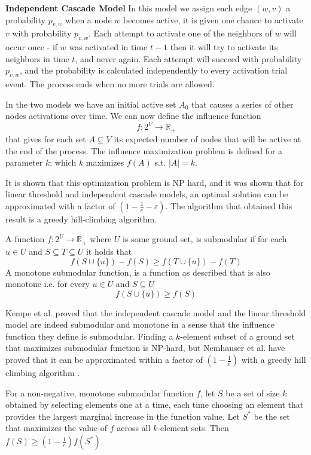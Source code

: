 \textbf{Independent Cascade Model}
In this model we assign each edge $(w,v)$ a probability $p_{v,w}$ when a node $w$ becomes active, it is given one chance to activate $v$ with probability $p_{v,w}$. Each attempt to activate one of the neighbors of $w$ will occur once - if $w$ was activated in time $t-1$ then it will try to activate its neighbors in time $t$, and never again. Each attempt will succeed with probability $p_{v,w}$, and the probability is calculated independently to every activation trial event. The process ends when no more trials are allowed.


In the two models we have an initial active set $A_0$ that causes a series of other nodes activations over time. We can now define the influence function $$f:2^V\rightarrow \mathbb{R}_+$$ that gives for each set $A\subseteq V$ its expected number of nodes that will be active at the end of the process. The influence maximization problem is defined for a parameter $k$: which $k$ maximizes $f(A)$ s.t. $|A|=k$.

It is shown \cite{kempe2003maximizing} that this optimization problem is NP hard, and it was shown that for linear threshold and independent cascade models, an optimal solution can be approximated with a factor of $(1-\frac{1}{e}-\varepsilon)$. The algorithm that obtained this result is a greedy hill-climbing algorithm. 


\begin{definition}
A function $f:2^U\rightarrow \mathbb{R}_+$ where $U$ is some ground set, is submodular if for each $u\in U$ and $S\subseteq T\subseteq U$ it holds that $$f(S\cup\{u\})-f(S)\ge f(T\cup\{u\})-f(T)$$ A monotone submodular function, is a function as described that is also monotone i.e. for every $u\in U$ and $S\subseteq U$ $$f(S\cup\{u\})\ge f(S)$$
\end{definition}

Kempe et al. proved that the independent cascade model and the linear threshold model are indeed submodular and monotone in a sense that the influence function they define is submodular. Finding a $k$-element subset of a ground set that maximizes submodular function is NP-hard, but Nemhauser et al.  have proved that it can be approximated within a factor of $(1-\frac{1}{e})$ with a greedy hill climbing algorithm  \cite{nemhauser1978analysis}. 

\begin{theorem} \label{thm:nemhauser}
\cite{nemhauser1978analysis} For a non-negative, monotone submodular function $f$, let $S$ be a set of size $k$ obtained by selecting elements one at a time, each time choosing an element that provides the largest marginal increase in the function value. Let $S^*$ be the set that maximizes the value of $f$ across all $k$-element sets. Then $f(S)\ge(1-\frac{1}{e})f(S^*)$. 
\end{theorem}

